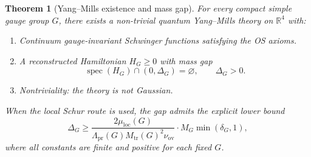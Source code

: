 \documentclass[12pt]{article}
\theoremstyle{plain}
\newtheorem{theorem}{Theorem}[section]
\theoremstyle{definition}
\numberwithin{equation}{section}
\newcommand{\R}{\mathbb{R}}
\newcommand{\spec}{\operatorname{spec}}
\newcommand{\pr}{\mathrm{pr}}
\newcommand{\loc}{\mathrm{loc}}
\newcommand{\ov}{\mathrm{ov}}
\newcommand{\tr}{\mathrm{tr}}
\begin{document}
\begin{theorem}[Yang--Mills existence and mass gap]\label{thm:main}
For every compact simple gauge group $G$, there exists a non-trivial quantum Yang--Mills theory on $\R^4$ with:
\begin{enumerate}[label=(\roman*)]
\item Continuum gauge-invariant Schwinger functions satisfying the OS axioms.
\item A reconstructed Hamiltonian $H_G\geq 0$ with mass gap
\begin{equation}
\boxed{\spec(H_G)\cap(0,\Delta_G)=\varnothing,\qquad \Delta_G>0.}
\end{equation}
\item Nontriviality: the theory is not Gaussian.
\end{enumerate}
When the local Schur route is used, the gap admits the explicit lower bound
\begin{equation}
\Delta_G \geq \frac{2\mu_{\loc}(G)}{\Lambda_{\pr}(G)M_{\tr}(G)^2\nu_{\ov}}\cdot M_G\min(\delta_G,1),
\end{equation}
where all constants are finite and positive for each fixed $G$.
\end{theorem}
\end{document}

